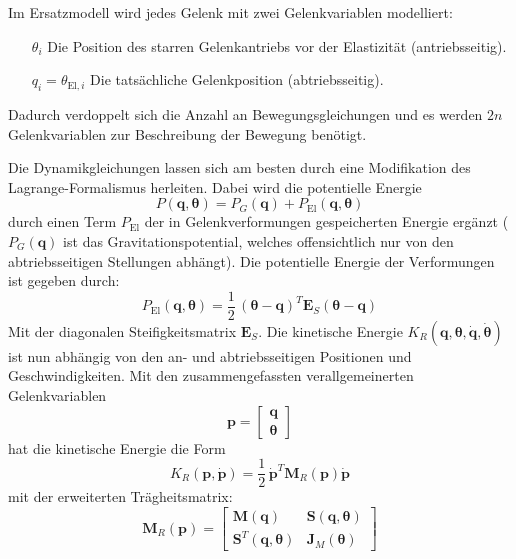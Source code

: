 \documentclass[a4paper, 11pt, accentcolor = tud3b]{tudreport}
\newcommand{\mat}[1]{\boldsymbol{#1}}
\renewcommand{\vec}[1]{\boldsymbol{\mathbf{#1}}}
\begin{document}
					Im Ersatzmodell wird jedes Gelenk mit zwei Gelenkvariablen modelliert:
					\begin{itemize}
						\item[\(\theta_i\)] Die Position des starren Gelenkantriebs vor der Elastizität (antriebsseitig).
						\item[\(q_i = \theta_{\text{El}, i}\)] Die tatsächliche Gelenkposition (abtriebsseitig).
					\end{itemize}
					Dadurch verdoppelt sich die Anzahl an Bewegungsgleichungen und es werden \(2n\) Gelenkvariablen zur Beschreibung der Bewegung benötigt.

					Die Dynamikgleichungen lassen sich am besten durch eine Modifikation des Lagrange-Formalismus herleiten. Dabei wird die potentielle Energie
					\begin{equation*}
						P(\vec{q}, \vec{\theta}\!) = P_G(\vec{q}\!) + P_\text{El}(\vec{q}, \vec{\theta}\!)
					\end{equation*}
					durch einen Term \( P_\text{El} \) der in Gelenkverformungen gespeicherten Energie ergänzt (\(P_G(\vec{q}\!)\) ist das Gravitationspotential, welches offensichtlich nur von den abtriebsseitigen Stellungen abhängt). Die potentielle Energie der Verformungen ist gegeben durch:
					\begin{equation*}
						P_\text{El}(\vec{q}, \vec{\theta}\!) = \frac{1}{2} \, (\vec{\theta} - \vec{q}\!)^T \mat{E}_S (\vec{\theta} - \vec{q}\!)
					\end{equation*}
					Mit der diagonalen Steifigkeitsmatrix \( \mat{E}_S \). Die kinetische Energie \( K_R(\vec{q}, \vec{\theta}, \dot{\vec{q}}, \dot{\vec{\theta}}\!) \) ist nun abhängig von den an- und abtriebsseitigen Positionen und Geschwindigkeiten. Mit den zusammengefassten verallgemeinerten Gelenkvariablen
					\begin{equation*}
						\vec{p} =
							\begin{bmatrix}
								\vec{q} \\
								\vec{\theta}
							\end{bmatrix}
					\end{equation*}
					hat die kinetische Energie die Form
					\begin{equation*}
						K_R(\vec{p}, \dot{\vec{p}}\!) = \frac{1}{2} \, \dot{\vec{p}}^T \mat{M}_R(\vec{p}\!) \dot{\vec{p}}
					\end{equation*}
					mit der erweiterten Trägheitsmatrix:
					\begin{equation*}
						\mat{M}_R(\vec{p}\!) =
							\begin{bmatrix}
								\mat{M}(\vec{q}\!)                 & \mat{S}(\vec{q}, \vec{\theta}\!) \\
								\mat{S}^T(\vec{q}, \vec{\theta}\!) & \mat{J}_M(\vec{\theta}\!)
							\end{bmatrix}
					\end{equation*}
\end{document}
